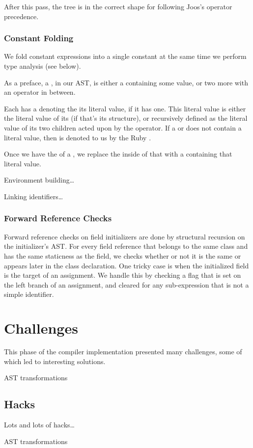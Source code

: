 \documentclass[pdftex,11pt,a4paper]{article}
\begin{document}
After this pass, the  tree is in the correct shape for
following Joos's operator precedence.

\subsubsection{Constant Folding}

We fold constant expressions into a single constant at the same time we perform
type analysis (see below).

As a preface, a , in our AST, is either a  containing some value, or two more  with an operator in
between.

Each  has a  denoting the its literal
value, if it has one. This literal value is either the literal value of its
 (if that's its structure), or recursively defined as the literal
value of its two  children acted upon by the operator. If
a  or  does not contain a literal value, then
 is denoted to us by the Ruby .

Once we have the  of a , we replace the
inside of that  with a  containing that literal
value.

Environment building\ldots


Linking identifiers\ldots


\subsubsection{Forward Reference Checks}

Forward reference checks on field initializers are done by structural recursion
on the initializer's AST. For every field reference that belongs to the same
class and has the same staticness as the field, we checks whether or not it is
the same or appears later in the class declaration. One tricky case is when the
initialized field is the target of an assignment. We handle this by checking a
flag that is set on the left branch of an assignment, and cleared for any
sub-expression that is not a simple identifier.


\section{Challenges}

This phase of the compiler implementation presented many
challenges, some of which led to interesting solutions.

AST transformations


\subsection{Hacks}

Lots and lots of hacks\ldots

AST transformations
\end{document}
